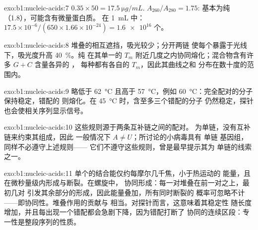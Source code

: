 \begin{solution}{exo:b1:nucleic-acids:7}
$0.35\times 50 = \qty{17.5}{\micro g/mL}$. $A_{260}/A_{280} = 1.75$:
基本为纯 （1.8），可能含有微量蛋白质。
在 \qty{1}{mL} 中：$17.5\times 10^{-6}/(650\times 1.66\times 10^{-24}) =
\num{1.6e16}$ 个。
\end{solution}

\begin{solution}{exo:b1:nucleic-acids:8}
堆叠的相互遮挡，吸光较少；分开两链
使每个暴露于光线下，吸光度升高
\qty{40}{\%}。纯  在其单一的
$T_m$ 附近几度之内协同熔化；混合物含有许多 $G + C$ 含量各异的 ，
每种都有各自的 $T_m$，因此其曲线之和
分布在数十度的范围内。
\end{solution}

\begin{solution}{exo:b1:nucleic-acids:9}
略低于 \qty{62}{\celsius} 且高于 \qty{57}{\celsius}，例如
\qty{60}{\celsius}：完全配对的分子保持稳定，错配的
则熔化。在 \qty{45}{\celsius} 时，含至多三个错配的分子
仍然稳定，探针也会使相关序列显示信号。
\end{solution}

\begin{solution}{exo:b1:nucleic-acids:10}
这些规则源于两条互补链之间的配对。
 为单链，没有互补链来约束其组成，因此
一般情况下 $A \neq U$；所讨论的小病毒具有
单链  基因组，同样不必遵守上述规则——
它们不遵守这些规则，曾是最早提示其为
单链的线索之一。
\end{solution}

\begin{solution}{exo:b1:nucleic-acids:11}
单个的结合能仅约每摩尔几千焦，小于热运动的
能量，且在微秒量级内形成与断裂。在螺旋中，
协同形成：每一对堆叠在前一对之上，最初几对
引发其余部分的形成，因此能量叠加，所有同时断裂的
概率可忽略不计——即协同性。堆叠作用的贡献与
相当。对探针而言，这意味着其稳定性
随长度增加，并且每出现一个错配都会急剧下降，因为错配打断了
协同的连续区段：专一性是整段序列的性质。
\end{solution}

